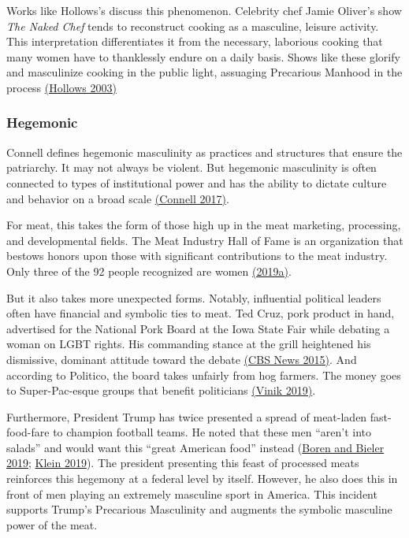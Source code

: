 \documentclass[twoside]{report}
\begin{document}
Works like Hollows's discuss this phenomenon. Celebrity chef Jamie Oliver's show \emph{The Naked Chef} tends to reconstruct cooking as a masculine, leisure activity. This interpretation differentiates it from the necessary, laborious cooking that many women have to thanklessly endure on a daily basis. Shows like these glorify and masculinize cooking in the public light, assuaging Precarious Manhood in the process \hyperlink{hollows}{(Hollows 2003)}

\subsubsection{Hegemonic}

Connell defines hegemonic masculinity as practices and structures that ensure the patriarchy. It may not always be violent. But hegemonic masculinity is often connected to types of institutional power and has the ability to dictate culture and behavior on a broad scale \hyperlink{connell}{(Connell 2017)}.

For meat, this takes the form of those high up in the meat marketing, processing, and developmental fields. The Meat Industry Hall of Fame is an organization that bestows honors upon those with significant contributions to the meat industry. Only three of the 92 people recognized are women \hyperlink{2019a}{(2019a)}.

But it also takes more unexpected forms. Notably, influential political leaders often have financial and symbolic ties to meat. Ted Cruz, pork product in hand, advertised for the National Pork Board at the Iowa State Fair while debating a woman on LGBT rights. His commanding stance at the grill heightened his dismissive, dominant attitude toward the debate \hyperlink{cbs}{(CBS News 2015)}. And according to Politico, the board takes unfairly from hog farmers. The money goes to Super-Pac-esque groups that benefit politicians \hyperlink{vinik}{(Vinik 2019)}.

Furthermore, President Trump has twice presented a spread of meat-laden fast-food-fare to champion football teams. He noted that these men ``aren't into salads'' and would want this ``great American food'' instead (\hyperlink{boren}{Boren and Bieler 2019}; \hyperlink{klein}{Klein 2019}). The president presenting this feast of processed meats reinforces this hegemony at a federal level by itself. However, he also does this in front of men playing an extremely masculine sport in America. This incident supports Trump's Precarious Masculinity and augments the symbolic masculine power of the meat.
\end{document}
